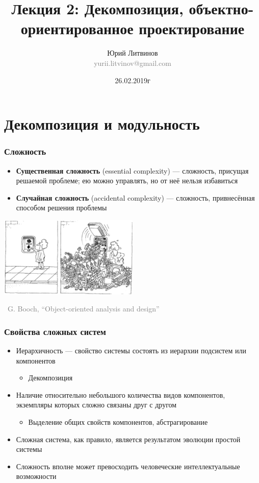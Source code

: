 \documentclass[xetex,mathserif,serif]{beamer}
\title[Декомпозиция, ООП]{Лекция 2: Декомпозиция, объектно-ориентированное проектирование}
\author[Юрий Литвинов]{Юрий Литвинов\\\small{\textcolor{gray}{yurii.litvinov@gmail.com}}}
\date{26.02.2019г}
\newcommand{\attribution}[1] {
	\begin{flushright}\begin{scriptsize}\textcolor{gray}{\textcopyright\, #1}\end{scriptsize}\end{flushright}
}
\begin{document}
	\frame{\titlepage}

	\section{Декомпозиция и модульность}

	\begin{frame}
		\frametitle{Сложность}
		\begin{itemize}
			\item \textbf{Существенная сложность} (essential complexity) --- сложность, присущая решаемой проблеме; ею можно управлять, но от неё нельзя избавиться
			\item \textbf{Случайная сложность} (accidental complexity) --- сложность, привнесённая способом решения проблемы
		\end{itemize}
		\vskip 0.5cm
		\begin{center}
			\includegraphics[width=0.5\textwidth]{complexityHiding.png}
		\end{center}
		\attribution{G. Booch, ``Object-oriented analysis and design''}
	\end{frame}

	\begin{frame}
		\frametitle{Свойства сложных систем}
		\begin{itemize}
			\item Иерархичность --- свойство системы состоять из иерархии подсистем или компонентов
			\begin{itemize}
				\item Декомпозиция
			\end{itemize}
			\item Наличие относительно небольшого количества видов компонентов, экземпляры которых сложно связаны друг с другом
			\begin{itemize}
				\item Выделение общих свойств компонентов, абстрагирование
			\end{itemize}
			\item Сложная система, как правило, является результатом эволюции простой системы
			\item Сложность вполне может превосходить человеческие интеллектуальные возможности
		\end{itemize}
	\end{frame}
\end{document}
